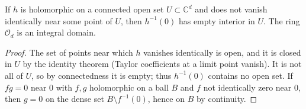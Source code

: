 \begin{lemma}
\label{lag:germ-domain}
\leanok
If \(h\) is holomorphic on a connected open set \(U\subset\mathbb C^d\) and does
not vanish identically near some point of \(U\), then \(h^{-1}(0)\) has empty
interior in \(U\). The ring \(\mathcal O_d\) is an integral domain.
\end{lemma}
\begin{proof}
\leanok
The set of points near which \(h\) vanishes identically is open, and it is closed
in \(U\) by the identity theorem (Taylor coefficients at a limit point vanish).
It is not all of \(U\), so by connectedness it is empty; thus \(h^{-1}(0)\)
contains no open set. If \(fg=0\) near \(0\) with \(f,g\) holomorphic on a ball
\(B\) and \(f\) not identically zero near \(0\), then \(g=0\) on the dense set
\(B\setminus f^{-1}(0)\), hence on \(B\) by continuity.
\end{proof}
